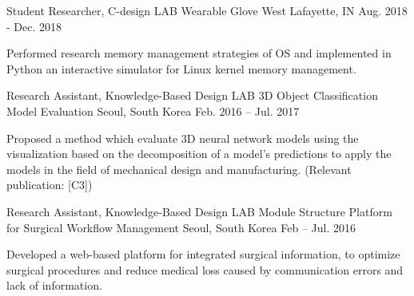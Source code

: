 \begin{cventries}

\cventry
{Student Researcher, C-design LAB} %
{Wearable Glove} %
{West Lafayette, IN} %
{Aug. 2018 - Dec. 2018} %
{ %
\begin{cvitems}
\item {Performed research memory management strategies of OS and implemented in Python an interactive simulator for Linux kernel memory management.}
\end{cvitems}
}


\cventry
{Research Assistant, Knowledge-Based Design LAB} %
{3D Object Classification Model Evaluation} %
{Seoul, South Korea} %
{Feb. 2016 – Jul. 2017} %
{ %
\begin{cvitems}
\item {Proposed a method which evaluate 3D neural network models using the visualization based on the decomposition of a model’s predictions to apply the models in the field of mechanical design and manufacturing. (Relevant publication: [C3])}
\end{cvitems}
}


\cventry
{Research Assistant, Knowledge-Based Design LAB} %
{Module Structure Platform for Surgical Workflow Management} %
{Seoul, South Korea} %
{Feb – Jul. 2016} %
{ %
\begin{cvitems}
\item {Developed a web-based platform for integrated surgical information, to optimize surgical procedures and reduce medical loss caused by communication errors and lack of information.}
\end{cvitems}
}


\end{cventries}